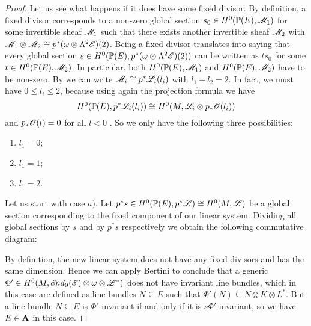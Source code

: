 \documentclass[A4paper, 12pt, british, reqno]{amsart}
\newcommand{\ot}{\otimes}
\newcommand{\dual}{^{*}}
\begin{document}
\begin{prop}
\begin{proof}
	Let us see what happens if it does have some fixed divisor.
	By definition, a fixed divisor corresponds to a non-zero global section $s_{0}\in H^{0}(\mathbb{P}(E),\mathscr{M}_{1})$ for some invertible sheaf $\mathscr{M}_{1}$ such that there exists another invertible sheaf $\mathscr{M}_{2}$ with $\M_{1}\ot \M_{2}\cong p^{*}(\w\ot\Lambda^{2}\E)(2)$.
	Being a fixed divisor translates into saying that every global section $s\in H^{0}(\P(E),p^{*}(\w\ot \Lambda^{2}\E)(2))$ can be written as $ts_{0}$ for some $t\in H^{0}(\mathbb{P}(E),\mathscr{M}_{2})$.
	In particular, both $H^{0}(\mathbb{P}(E),\mathscr{M}_{1})$ and $H^{0}(\mathbb{P}(E),\mathscr{M}_{2})$ have to be non-zero.
	By \cite[Exercise II.7.4]{har77} we can write $\mathscr{M}_{i}\cong p^{*}\mathscr{L}_{i}(l_{i})$ with $l_{1}+l_{2}=2$.
	In fact, we must have $0\leqslant l_{i}\leqslant 2$, because using again the projection formula we have
	\[ H^{0}(\P(E),p^{*}\L_{i}(l_{i}))\cong H^{0}(M,\L_{i}\ot p_{*}\O(l_{i})) \]
	and $p_{*}\mathscr{O}(l)=0$ for all $l<0$ \cite[Exercise III.8.4]{har77}.
	So we only have the following three possibilities:
	\begin{enumerate}[label=\alph*)]
	    \item $l_{1}=0$;
	    \item $l_{1}=1$;
	    \item $l_{1}=2$.
	\end{enumerate}
	Let us start with case $a)$.
	Let $p^{*}s\in H^{0}(\mathbb{P}(E),p^{*}\mathscr{L})\cong H^{0}(M,\mathscr{L})$ be a global section corresponding to the fixed component of our linear system.
	Dividing all global sections by $s$ and by $p^{*}s$ respectively we obtain the following commutative diagram:
	\begin{center}
	\end{center}
	By definition, the new linear system does not have any fixed divisors and has the same dimension.
	Hence we can apply Bertini to conclude that a generic $\Phi'\in H^{0}(M,\sEnd_{0}(\E)\ot \w\ot \L\dual)$ does not have invariant line bundles, which in this case are defined as line bundles $N\subseteq E$ such that $\Phi'(N)\subseteq N\ot K\ot L\dual$.
	But a line bundle $N\subseteq E$ is $\Phi'$-invariant if and only if it is $s\Phi'$-invariant, so we have $E\in \mathbf{A}$ in this case.


\end{proof}
\end{prop}
\end{document}
